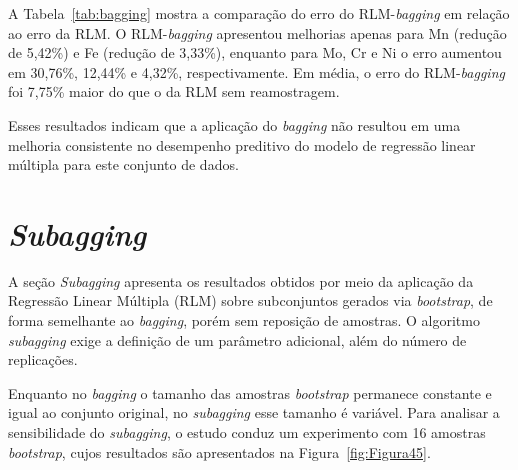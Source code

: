 A Tabela~\ref{tab:bagging} mostra a comparação do erro do RLM-\textit{bagging} em relação ao erro da RLM. O RLM-\textit{bagging} apresentou melhorias apenas para Mn (redução de 5,42\%) e Fe (redução de 3,33\%), enquanto para Mo, Cr e Ni o erro aumentou em 30,76\%, 12,44\% e 4,32\%, respectivamente. Em média, o erro do RLM-\textit{bagging} foi 7,75\% maior do que o da RLM sem reamostragem.

Esses resultados indicam que a aplicação do \textit{bagging} não resultou em uma melhoria consistente no desempenho preditivo do modelo de regressão linear múltipla para este conjunto de dados.

\section{\textit{Subagging}}
\label{sec:subagging2}

A seção \textit{Subagging} apresenta os resultados obtidos por meio da aplicação da Regressão Linear Múltipla (RLM) sobre subconjuntos gerados via \textit{bootstrap}, de forma semelhante ao \textit{bagging}, porém sem reposição de amostras. O algoritmo \textit{subagging} exige a definição de um parâmetro adicional, além do número de replicações.

Enquanto no \textit{bagging} o tamanho das amostras \textit{bootstrap} permanece constante e igual ao conjunto original, no \textit{subagging} esse tamanho é variável. Para analisar a sensibilidade do \textit{subagging}, o estudo conduz um experimento com 16 amostras \textit{bootstrap}, cujos resultados são apresentados na Figura~\ref{fig:Figura45}.

